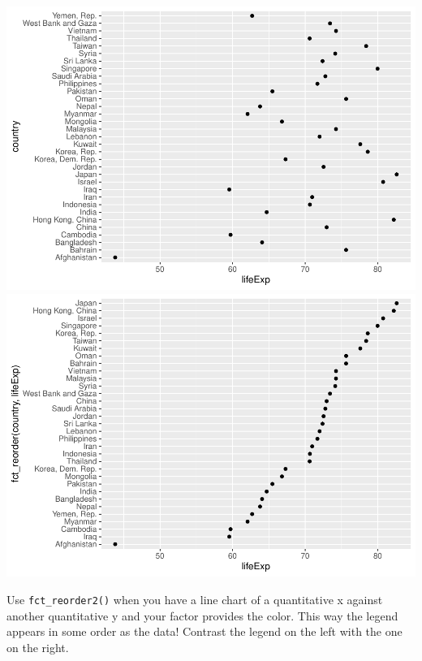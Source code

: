 \documentclass[
]{book}
\newenvironment{Shaded}{\begin{snugshade}}{\end{snugshade}}
\newcommand{\DataTypeTok}[1]{\textcolor[rgb]{0.13,0.29,0.53}{#1}}
\newcommand{\DecValTok}[1]{\textcolor[rgb]{0.00,0.00,0.81}{#1}}
\newcommand{\KeywordTok}[1]{\textcolor[rgb]{0.13,0.29,0.53}{\textbf{#1}}}
\newcommand{\NormalTok}[1]{#1}
\newcommand{\OperatorTok}[1]{\textcolor[rgb]{0.81,0.36,0.00}{\textbf{#1}}}
\newcommand{\StringTok}[1]{\textcolor[rgb]{0.31,0.60,0.02}{#1}}
\begin{document}
\begin{Shaded}
\end{Shaded}

\includegraphics[width=0.49\linewidth]{10_factors_files/figure-latex/alpha-order-silly-1} \includegraphics[width=0.49\linewidth]{10_factors_files/figure-latex/alpha-order-silly-2}

Use \texttt{fct\_reorder2()} when you have a line chart of a quantitative x against another quantitative y and your factor provides the color. This way the legend appears in some order as the data! Contrast the legend on the left with the one on the right.
\end{document}
